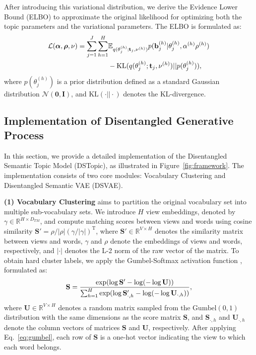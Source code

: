 After introducing this variational distribution, we derive the Evidence Lower Bound (ELBO) to approximate the original likelihood for optimizing both the topic parameters and the variational parameters. The ELBO is formulated as:
\begin{align}
    \mathcal{L}(\bm{\alpha}, \bm{\rho}, \nu) = \sum_{j=1}^J \sum_{h=1}^H &\mathbb{E}_{q(\theta_j^{(h)}; \mathbf{t}_j, \nu^{(h)})} p(\mathbf{b}_j^{(h)} | \theta_j^{(h)}, \alpha^{(h)} \rho^{(h)})  \notag \\
    &- \text{KL}(q(\theta_j^{(h)}; \mathbf{t}_j, \nu^{(h)}) || p(\theta_j^{(h)})),
    \label{eq:elbo}
\end{align}
where $ p(\theta_j^{(h)}) $ is a prior distribution defined as a standard Gaussian distribution $ \mathcal{N}(\mathbf{0}, \mathbf{I}) $, and $\text{KL}(\cdot ||\cdot)$ denotes the KL-divergence.


\subsection{Implementation of Disentangled Generative Process}
In this section, we provide a detailed implementation of the Disentangled Semantic Topic Model (DSTopic), as illustrated in Figure~\ref{fig:framework}. The implementation consists of two core modules: Vocabulary Clustering and Disentangled Semantic VAE (DSVAE).

\noindent \textbf{(1) Vocabulary Clustering} aims to partition the original vocabulary set into multiple sub-vocabulary sets. We introduce $H$ view embeddings, denoted by $\gamma \in \mathbb{R}^{H \times D_{TM}}$, and compute matching scores between views and words using cosine similarity  $\mathbf{S}' = \rho / |\rho| \left(\gamma /|\gamma|\right)^{\mathrm{T}}$,
where $\mathbf{S}' \in \mathbb{R}^{V \times H}$ denotes the similarity matrix between views and words, $\gamma$ and $\rho$ denote the embeddings of views and words, respectively, and $|\cdot|$ denotes the L-2 norm of the raw vector of the matrix. To obtain hard cluster labels, we apply the Gumbel-Softmax activation function \cite{jang2016categorical}, formulated as:
\begin{align}
\small
    \mathbf{S} = \frac{\exp(\log \mathbf{S}' - \log(-\log \mathbf{U}))}{\sum_{h=1}^H \exp(\log \mathbf{S}_{\cdot,h}' - \log(-\log \mathbf{U}_{\cdot,h}))} ,
    \label{eq:gumbel}
\end{align}
where $\mathbf{U} \in \mathbb{R}^{V \times H}$ denotes a random matrix sampled from the $\text{Gumbel}(0,1)$ distribution with the same dimensions as the score matrix $\mathbf{S}$, and $\mathbf{S}_{\cdot,h}$ and $\mathbf{U}_{\cdot,h}$ denote the column vectors of matrices $\mathbf{S}$ and $\mathbf{U}$, respectively. After applying Eq.~\ref{eq:gumbel}, each row of $\mathbf{S}$ is a one-hot vector indicating the view to which each word belongs.

